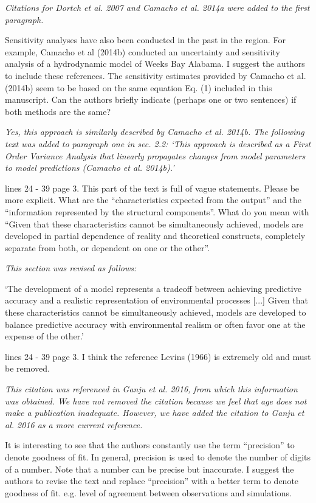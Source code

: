 \documentclass[letterpaper,12pt]{article}\usepackage[]{graphicx}\usepackage[]{color}
\begin{document}
{\it Citations for Dortch et al. 2007 and Camacho et al. 2014a were added to the first paragraph.}

Sensitivity analyses have also been conducted in the past in the region. For example, Camacho et al (2014b) conducted an uncertainty and sensitivity analysis of a hydrodynamic model of Weeks Bay Alabama. I suggest the authors to include these references. The sensitivity estimates provided by Camacho et al. (2014b) seem to be based on the same equation Eq. (1) included in this manuscript. Can the authors briefly indicate (perhaps one or two sentences) if both methods are the same?

{\it Yes, this approach is similarly described by Camacho et al. 2014b.  The following text was added to paragraph one in sec. 2.2: `This approach is described as a First Order Variance Analysis that linearly propagates changes from model parameters to model predictions (Camacho et al. 2014b).'}

lines 24 - 39 page 3. This part of the text is full of vague statements. Please be more explicit. What are the ``characteristics expected from the output'' and the ``information represented by the structural components''. What do you mean with ``Given that these characteristics cannot be simultaneously achieved, models are developed in partial dependence of reality and theoretical constructs, completely separate from both, or dependent on one or the other''.

{\it This section was revised as follows:

`The development of a model represents a tradeoff between achieving predictive accuracy and a realistic representation of environmental processes [...] Given that these characteristics cannot be simultaneously achieved, models are developed to balance predictive accuracy with environmental realism or often favor one at the expense of the other.'

}

lines 24 - 39 page 3. I think the reference Levins (1966) is extremely old and must be removed. 

{\it This citation was referenced in Ganju et al. 2016, from which this information was obtained.  We have not removed the citation because we feel that age does not make a publication inadequate.  However, we have added the citation to Ganju et al. 2016 as a more current reference.}

It is interesting to see that the authors constantly use the term ``precision'' to denote goodness of fit. In general, precision is used to denote the number of digits of a number. Note that a number can be precise but inaccurate. I suggest the authors to revise the text and replace ``precision'' with a better term to denote goodness of fit. e.g. level of agreement between observations and simulations. 
\end{document}
